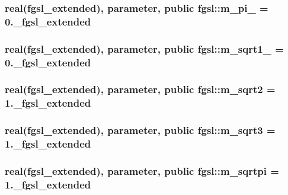 \subsubsection[{m\+\_\+pi\+\_\+4}]{\setlength{\rightskip}{0pt plus 5cm}real({\bf fgsl\+\_\+extended}), parameter, public fgsl\+::m\+\_\+pi\+\_ = 0.\+\_\+fgsl\+\_\+extended}\label{namespacefgsl_ac72cdbd05abd60541bd253d571673cf4}
\hypertarget{namespacefgsl_aa15c7774ec8561b9221b81138e50d715}{}
\subsubsection[{m\+\_\+sqrt1\+\_\+2}]{\setlength{\rightskip}{0pt plus 5cm}real({\bf fgsl\+\_\+extended}), parameter, public fgsl\+::m\+\_\+sqrt1\+\_ = 0.\+\_\+fgsl\+\_\+extended}\label{namespacefgsl_aa15c7774ec8561b9221b81138e50d715}
\hypertarget{namespacefgsl_a7d0e2199519f7100527499e3c206fc31}{}
\subsubsection[{m\+\_\+sqrt2}]{\setlength{\rightskip}{0pt plus 5cm}real({\bf fgsl\+\_\+extended}), parameter, public fgsl\+::m\+\_\+sqrt2 = 1.\+\_\+fgsl\+\_\+extended}\label{namespacefgsl_a7d0e2199519f7100527499e3c206fc31}
\hypertarget{namespacefgsl_acdd93c47924b7382b9ab00728cc46b9f}{}
\subsubsection[{m\+\_\+sqrt3}]{\setlength{\rightskip}{0pt plus 5cm}real({\bf fgsl\+\_\+extended}), parameter, public fgsl\+::m\+\_\+sqrt3 = 1.\+\_\+fgsl\+\_\+extended}\label{namespacefgsl_acdd93c47924b7382b9ab00728cc46b9f}
\hypertarget{namespacefgsl_aa32be73a066aea0217a624284ae34c39}{}
\subsubsection[{m\+\_\+sqrtpi}]{\setlength{\rightskip}{0pt plus 5cm}real({\bf fgsl\+\_\+extended}), parameter, public fgsl\+::m\+\_\+sqrtpi = 1.\+\_\+fgsl\+\_\+extended}\label{namespacefgsl_aa32be73a066aea0217a624284ae34c39}
